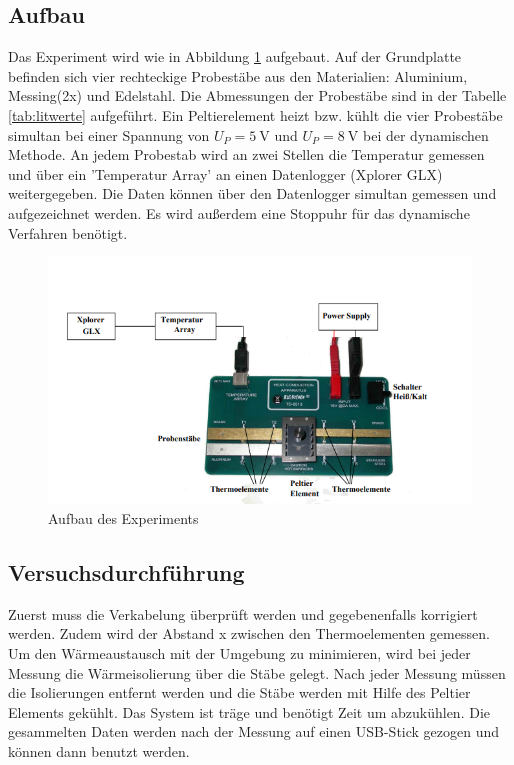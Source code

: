 \subsection{Aufbau}
Das Experiment wird wie in Abbildung \ref{fig:aufbau} aufgebaut. Auf der Grundplatte befinden sich vier rechteckige Probestäbe aus den Materialien:
Aluminium, Messing(2x) und Edelstahl. Die Abmessungen der Probestäbe sind in der Tabelle \ref{tab:litwerte} aufgeführt.
Ein Peltierelement heizt bzw. kühlt die vier Probestäbe simultan bei einer Spannung von $U_P=\SI{5}{\volt}$
und $U_P=\SI{8}{\volt}$ bei der dynamischen Methode. An jedem Probestab wird an zwei Stellen die Temperatur gemessen und über ein 'Temperatur Array'
an einen Datenlogger (Xplorer GLX) weitergegeben. Die Daten können über den Datenlogger simultan gemessen und aufgezeichnet werden. 
Es wird außerdem eine Stoppuhr für das dynamische Verfahren benötigt.
\begin{figure}
    \centering
    \includegraphics[scale=0.7]{Aufbau.pdf}
    \caption{Aufbau des Experiments}
    \label{fig:aufbau}
\end{figure}
\subsection{Versuchsdurchführung}
\label{sec:Vdurch}
Zuerst muss die Verkabelung überprüft werden und gegebenenfalls korrigiert werden. 
Zudem wird der Abstand x zwischen den Thermoelementen gemessen.
Um den Wärmeaustausch mit der Umgebung zu minimieren, wird bei jeder
Messung die Wärmeisolierung über die Stäbe gelegt. Nach jeder Messung müssen die Isolierungen entfernt werden und die Stäbe werden mit Hilfe des Peltier Elements gekühlt.
Das System ist träge und benötigt Zeit um abzukühlen. Die gesammelten Daten werden nach der Messung auf einen USB-Stick gezogen und können dann benutzt werden.\\
